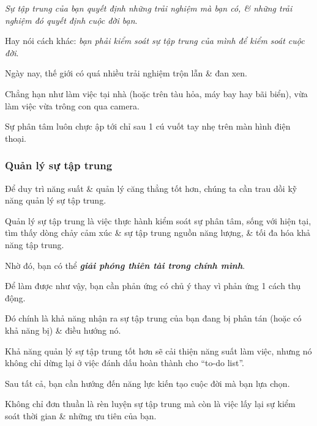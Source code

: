 \documentclass{article}
\begin{document}
%
\textit{Sự tập trung của bạn quyết định những trải nghiệm mà bạn có, \& những trải nghiệm đó quyết định cuộc đời bạn}.

Hay nói cách khác: \textit{bạn phải kiểm soát sự tập trung của mình để kiểm soát cuộc đời}.

Ngày nay, thế giới có quá nhiều trải nghiệm trộn lẫn \& đan xen.

Chẳng hạn như làm việc tại nhà (hoặc trên tàu hỏa, máy bay hay bãi biển), vừa làm việc vừa trông con qua camera.

Sự phân tâm luôn chực ập tới chỉ sau 1 cú vuốt tay nhẹ trên màn hình điện thoại.

\subsubsection{Quản lý sự tập trung}
Để duy trì năng suất \& quản lý căng thẳng tốt hơn, chúng ta cần trau dồi kỹ năng quản lý sự tập trung.

%
Quản lý sự tập trung là việc thực hành kiểm soát sự phân tâm, sống với hiện tại, tìm thấy dòng chảy cảm xúc \& sự tập trung nguồn năng lượng, \& tối đa hóa khả năng tập trung.

Nhờ đó, bạn có thể \textbf{\textit{giải phóng thiên tài trong chính mình}}.

Để làm được như vậy, bạn cần phản ứng có chủ ý thay vì phản ứng 1 cách thụ động.

Đó chính là khả năng nhận ra sự tập trung của bạn đang bị phân tán (hoặc có khả năng bị) \& điều hướng nó.

%
Khả năng quản lý sự tập trung tốt hơn sẽ cải thiện năng suất làm việc, nhưng nó không chỉ dừng lại ở việc đánh dấu hoàn thành cho ``to-do list''.

Sau tất cả, bạn cần hướng đến năng lực kiến tạo cuộc đời mà bạn lựa chọn.

Không chỉ đơn thuần là rèn luyện sự tập trung mà còn là việc lấy lại sự kiểm soát thời gian \& những ưu tiên của bạn.
\end{document}
